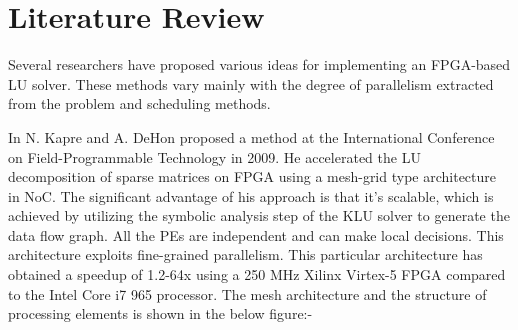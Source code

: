 \chapter{Literature Review}
\label{chapter:litRev}
Several researchers have proposed various ideas for implementing an FPGA-based LU solver. These methods vary mainly with the degree of parallelism extracted from the problem and scheduling methods.

In \cite{Kapre} N. Kapre and A. DeHon proposed a method at the International Conference on Field-Programmable Technology in 2009. He accelerated the LU decomposition of sparse matrices on FPGA using a mesh-grid type architecture in NoC. The significant advantage of his approach is that it’s scalable, which is achieved by utilizing the symbolic analysis step of the KLU solver to generate the data flow graph. All the PEs are independent and can make local decisions. This architecture exploits fine-grained parallelism. This particular architecture has obtained a speedup of 1.2-64x using a 250 MHz Xilinx Virtex-5 FPGA compared to the Intel Core i7 965 processor. The mesh architecture and the structure of processing elements is shown in the below figure:-

